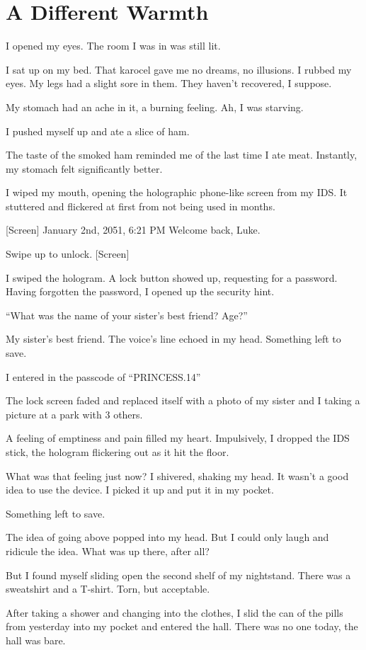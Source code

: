 \section{A Different Warmth}
I opened my eyes. The room I was in was still lit. 

I sat up on my bed. That karocel gave me no dreams, no illusions. I rubbed my eyes. My legs had a slight sore in them. They haven’t recovered, I suppose.

My stomach had an ache in it, a burning feeling. Ah, I was starving.

I pushed myself up and ate a slice of ham.

The taste of the smoked ham reminded me of the last time I ate meat. Instantly, my stomach felt significantly better.

I wiped my mouth, opening the holographic phone-like screen from my IDS. It stuttered and flickered at first from not being used in months.

[Screen]
January 2nd, 2051, 6:21 PM
Welcome back, Luke. 

Swipe up to unlock.
[Screen]

I swiped the hologram. A lock button showed up, requesting for a password. Having forgotten the password, I opened up the security hint.

“What was the name of your sister’s best friend? Age?”

My sister’s best friend. The voice’s line echoed in my head. Something left to save.

I entered in the passcode of “PRINCESS.14”

The lock screen faded and replaced itself with a photo of my sister and I taking a picture at a park with 3 others.

A feeling of emptiness and pain filled my heart. Impulsively, I dropped the IDS stick, the hologram flickering out as it hit the floor.

What was that feeling just now? I shivered, shaking my head. It wasn’t a good idea to use the device. I picked it up and put it in my pocket. 

Something left to save.

The idea of going above popped into my head. But I could only laugh and ridicule the idea. What was up there, after all?

But I found myself sliding open the second shelf of my nightstand. There was a sweatshirt and a T-shirt. Torn, but acceptable.

After taking a shower and changing into the clothes, I slid the can of the pills from yesterday into my pocket and entered the hall. There was no one today, the hall was bare. 

